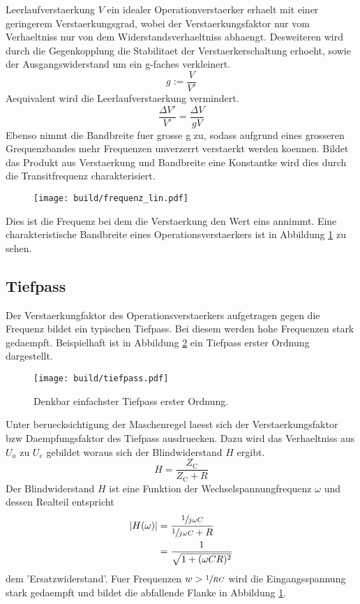 Leerlaufverstaerkung $V$ ein idealer Operationverstaerker erhaelt mit einer
geringerem Verstaerkungsgrad, wobei der Verstaerkungsfaktor nur vom Verhaeltniss
nur von dem Widerstandsverhaeltniss abhaengt.
Desweiteren wird durch die Gegenkopplung die Stabilitaet der
Verstaerkerschaltung erhoeht, sowie der Ausgangswiderstand um ein g-faches
verkleinert.
\begin{equation}
		g := \frac{V}{V'}
\end{equation}
Aequivalent wird die Leerlaufverstaerkung vermindert.
\begin{equation}
		\frac{\Delta V'}{V'} = \frac{\Delta V}{g V}
\end{equation}
Ebenso nimmt die Bandbreite fuer grosse g zu, sodass aufgrund eines grosseren
Grequenzbandes mehr Frequenzen unverzerrt verstaerkt werden koennen.
Bildet das Produkt aus Verstaerkung und Bandbreite eine Konstantke wird dies
durch die Transitfrequenz charakterisiert.
\begin{figure}[h]
		\centering
		\texttt{[image: build/frequenz\_lin.pdf]}
		\caption{\cite{anleitung}}
		\label{fig:freq}
\end{figure}
Dies ist die Frequenz bei dem die Verstaerkung den Wert eins annimmt.
Eine charakteristische Bandbreite eines Operationsverstaerkers ist in Abbildung
\ref{fig:freq} zu sehen.

\subsection{Tiefpass}%
\label{sub:tiefpass}

Der Verstaerkungfaktor des Operationsverstaerkers aufgetragen gegen die Frequenz bildet ein typischen
Tiefpass.
Bei diesem werden hohe Frequenzen stark gedaempft. 
Beispielhaft ist in Abbildung \ref{fig:tiefpass} ein Tiefpass erster Ordnung
dargestellt.
\begin{figure}[h]
		\centering
		\texttt{[image: build/tiefpass.pdf]}
		\caption{Denkbar einfachster Tiefpass erster Ordnung. \cite{wiki}}
		\label{fig:tiefpass}
\end{figure}
Unter beruecksichtigung der Maschenregel laesst sich der Verstaerkungsfaktor bzw
Daempfungsfaktor des Tiefpass ausdruecken. 
Dazu wird das Verhaeltniss aus $U_a$ zu $U_e$ gebildet woraus sich der
Blindwiderstand $H$ ergibt.
\begin{equation}
		\label{eq:blindwiederstand}
		H = \frac{Z_\text{C}}{Z_\text{C} + R} 
\end{equation}
Der Blindwiderstand $H$ ist eine Funktion der Wechselspannungfrequenz $\omega$
und dessen Realteil entspricht 
\begin{align}
		\label{eq:h_betrag}
		\left| H(\omega) \right| &= \frac{\sfrac{1}{j \omega C}}{\sfrac{1}{j\omega
		C} + R}  \\
								 &= \frac{1}{\sqrt{1 + (\omega CR)^2}}
\end{align}
dem 'Ersatzwiderstand'.
Fuer Frequenzen $w > \sfrac{1}{RC}$ wird die Eingangsspannung stark gedaempft und bildet
die abfallende Flanke in Abbildung \ref{fig:freq}.

